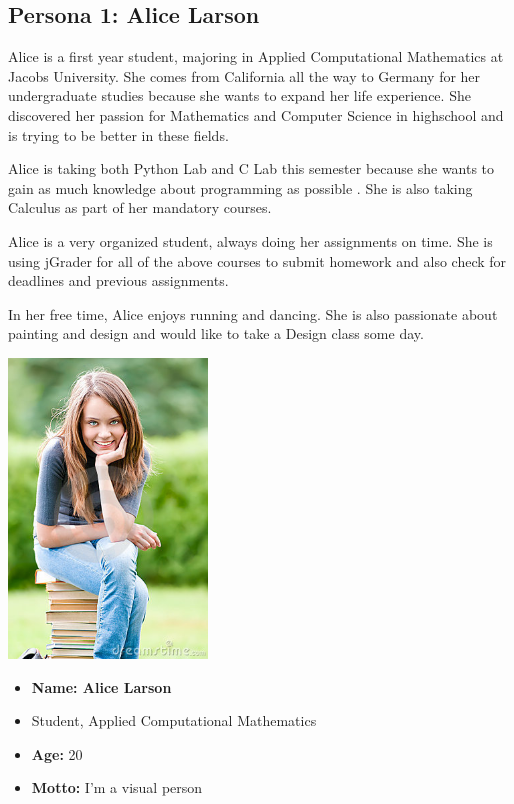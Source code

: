 \subsection{Persona 1: Alice Larson}

Alice is a first year student, majoring in Applied Computational Mathematics  at Jacobs University.  She comes from California all the way to Germany for her undergraduate studies because she wants to expand her life experience.
She discovered her passion for  Mathematics and Computer Science in highschool and is trying to be better in these fields.

Alice is taking both Python Lab and C Lab this semester because she wants to gain as much knowledge about programming as possible . She is also taking Calculus as part of her mandatory courses.

Alice is a very organized student, always doing her assignments on time. She is using jGrader for all of the above courses to submit homework and also check for deadlines and previous assignments.

In her free time, Alice enjoys running and dancing. She is also passionate about painting and design and would like to take a Design class some day.


\begin{center}
  \includegraphics[width=200px]{personas/alice.jpg}
\end{center}

\begin{itemize}
  \item \textbf{Name: Alice Larson}
  \item Student, Applied Computational Mathematics
  \item \textbf{Age:} 20
  \item \textbf{Motto:} I'm a visual person
\end{itemize}



